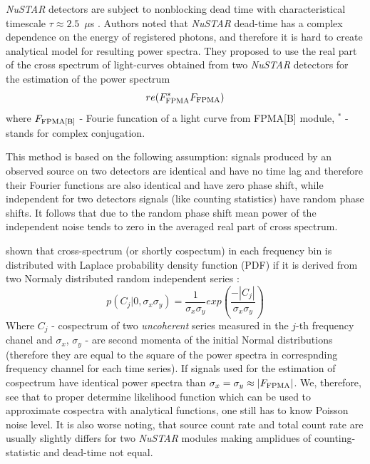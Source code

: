 \documentclass[a4paper,fleqn,usenatbib]{mnras}
\begin{document}
{\it NuSTAR} detectors are subject to nonblocking dead time with characteristical timescale $\tau \approx 2.5$~$\mu$s \cite{2015ApJ...800..109B}.
Authors noted that {\it NuSTAR} dead-time has a complex dependence on the energy of registered photons, and therefore it is hard to create analytical model for resulting power spectra. 
They proposed to use the real part of the cross spectrum of light-curves obtained from two {\it NuSTAR} detectors for the estimation of the power spectrum 
\begin{equation}
        re(F_{\rm FPMA}^{*}F_{\rm FPMA})
\end{equation}
where $F_{\rm FPMA[B]}$ - Fourie funcation of a light curve from FPMA[B] module, $^{*}$ - stands for complex conjugation. 

This method is based on the following assumption: signals produced by an observed source on two detectors are identical and have no time lag and therefore their Fourier functions are also identical and have zero phase shift, while independent for two detectors signals (like counting statistics) have random phase shifts.  
It follows that due to the random phase shift mean power of the independent noise tends to zero in the averaged real part of cross spectrum.

\citep{2017arXiv170909666H} shown that cross-spectrum (or shortly cospectum) in each frequency bin is distributed with Laplace probability density function (PDF) if it is derived from two Normaly distributed random independent series \citep[see, e.q. 14 in ][]{2017arXiv170909666H}:
\begin{equation}
        p(C_{j}|0, \sigma_x \sigma_y) = \frac{1}{\sigma_x \sigma_y} exp{\left(\frac{-|C_{j}|}{\sigma_x \sigma_y} \right)}
\end{equation}
Where $C_{j}$ - cospectrum of two {\it uncoherent} series measured in the $j$-th frequency chanel and $\sigma_x$, $\sigma_y$ - are second momenta of the initial Normal distributions (therefore they are equal to the square of the power spectra in correspnding frequency channel for each time series).
If signals used for the estimation of cospectrum have identical power spectra than $\sigma_x = \sigma_y \approx |F_{\rm FPMA}|$.
We, therefore, see that to proper determine likelihood function which can be used to approximate cospectra with analytical functions, one still has to know Poisson noise level.
It is also worse noting, that source count rate and total count rate are usually slightly differs for two {\it NuSTAR} modules making amplidues of counting-statistic and dead-time not equal.
\end{document}
